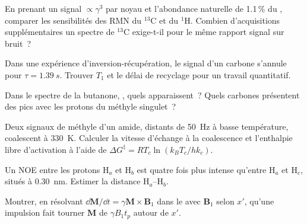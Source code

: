 \begin{exercise}[$\star\star$]\label{exo:b3:advanced-nmr:5}
En prenant un signal $\propto\gamma^3$ par noyau et l'abondance naturelle
de 1.1\,\% du
, comparer les sensibilités des RMN du ${}^{13}$C et du
${}^1$H. Combien d'acquisitions supplémentaires un spectre de ${}^{13}$C
exige-t-il pour le même rapport signal sur bruit~?
\end{exercise}

\begin{exercise}[$\star\star$]\label{exo:b3:advanced-nmr:6}
Dans une expérience d'inversion-récupération, le signal d'un carbone
s'annule pour
$\tau = \qty{1.39}{s}$. Trouver $T_1$ et le délai de recyclage pour un
travail quantitatif.
\end{exercise}

\begin{exercise}[$\star\star$]\label{exo:b3:advanced-nmr:7}
Dans le spectre  de la butanone, , quels  apparaissent~? Quels carbones présentent des pics  avec
les protons du méthyle singulet~?
\end{exercise}

\begin{exercise}[$\star\star$]\label{exo:b3:advanced-nmr:8}
Deux signaux de méthyle d'un amide, distants de \qty{50}{Hz} à basse
température, coalescent à
\qty{330}{K}. Calculer la vitesse d'échange à la coalescence et
l'enthalpie libre d'activation à l'aide de
$\Delta G^\ddagger = RT_c\ln(k_BT_c/hk_c)$.
\end{exercise}

\begin{exercise}[$\star\star$]\label{exo:b3:advanced-nmr:9}
Un NOE entre les protons H$_a$ et H$_b$ est quatre fois plus intense
qu'entre H$_a$ et
H$_c$, situés à \qty{0.30}{nm}. Estimer la distance H$_a$--H$_b$.
\end{exercise}

\begin{exercise}[$\star\star\star$]\label{exo:b3:advanced-nmr:10}
Montrer, en résolvant $\dd\mathbf M/\dd t = \gamma\mathbf M\times\mathbf B_1$ dans le 
avec $\mathbf B_1$ selon $x'$, qu'une impulsion fait tourner $\mathbf M$
de $\gamma B_1t_p$ autour de $x'$.
\end{exercise}


